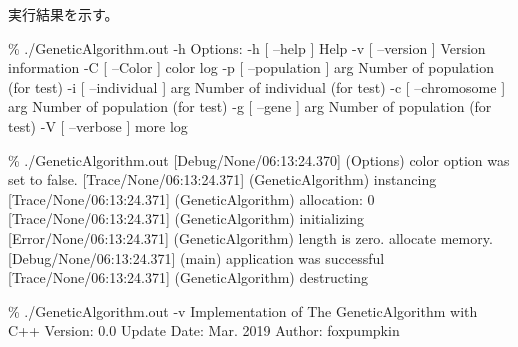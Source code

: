 実行結果を示す。


\begin{DoxyPre}
\% ./GeneticAlgorithm.out -h
Options:
  -h [ --help ]           Help
  -v [ --version ]        Version information
  -C [ --Color ]          color log
  -p [ --population ] arg Number of population (for test)
  -i [ --individual ] arg Number of individual (for test)
  -c [ --chromosome ] arg Number of population (for test)
  -g [ --gene ] arg       Number of population (for test)
  -V [ --verbose ]        more log
\end{DoxyPre}



\begin{DoxyPre}
\% ./GeneticAlgorithm.out
[Debug/None/06:13:24.370] (Options) color option was set to false.
[Trace/None/06:13:24.371] (GeneticAlgorithm) instancing
[Trace/None/06:13:24.371] (GeneticAlgorithm) allocation: 0
[Trace/None/06:13:24.371] (GeneticAlgorithm) initializing
[Error/None/06:13:24.371] (GeneticAlgorithm) length is zero. allocate memory.
[Debug/None/06:13:24.371] (main) application was successful
[Trace/None/06:13:24.371] (GeneticAlgorithm) destructing
\end{DoxyPre}



\begin{DoxyPre}
\% ./GeneticAlgorithm.out -v
Implementation of The GeneticAlgorithm with C++
     Version: 0.0
 Update Date: Mar. 2019
      Author: foxpumpkin
\end{DoxyPre}
 